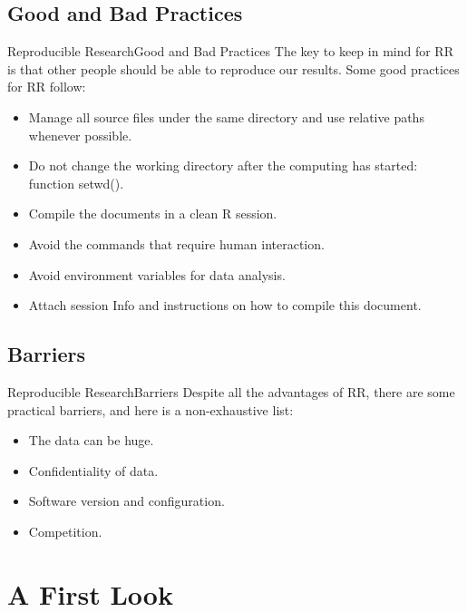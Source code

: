 \documentclass[10pt]{beamer}
\begin{document}
\subsection{Good and Bad Practices}
\begin{frame}{Reproducible Research}{Good and Bad Practices}
	The key to keep in mind for RR is that other people should be able to
	reproduce our results. Some good practices for RR follow:
	\begin{itemize}
		\item<1->Manage all source files under the same directory and use relative
		paths whenever possible.
		\item<1->Do not change the working directory after the computing has started: function setwd().
		\item<1->Compile the documents in a clean R session.
		\item<1->Avoid the commands that require human interaction.
		\item<1->Avoid environment variables for data analysis.
		\item<1->Attach session Info and instructions on how to compile this document.
	\end{itemize}
\end{frame}

\subsection{Barriers}
\begin{frame}{Reproducible Research}{Barriers}
	Despite all the advantages of RR, there are some practical barriers, and here is a non-exhaustive list:
	\begin{itemize}
		\item<1->The data can be huge.
		\item<1->Confidentiality of data.
		\item<1->Software version and configuration.
		\item<1->Competition.
	\end{itemize}
\end{frame}


\section{A First Look}
\end{document}

